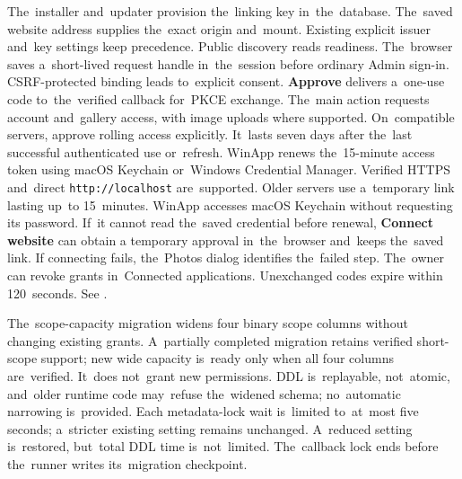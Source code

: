\documentclass[11pt,a4paper]{article}
\newcommand{\filepath}[1]{\path{#1}}
\newcommand{\ui}[1]{\textbf{#1}}
\begin{document}
The~installer and~updater provision the~linking key in~the~database.
The~saved website address supplies the~exact origin and~mount.
Existing explicit issuer and~key settings keep precedence. Public discovery
reads readiness. The~browser saves a~short-lived request handle in~the~session
before ordinary Admin sign-in. CSRF-protected binding leads to~explicit consent.
\ui{Approve} delivers a~one-use code to~the~verified callback for~PKCE exchange.
The~main action requests account and~gallery access, with image uploads where
supported. On~compatible servers, approve rolling access explicitly. It~lasts
seven days after the~last successful authenticated use or~refresh. WinApp
renews the~15-minute access token using macOS Keychain or~Windows Credential
Manager. Verified HTTPS and~direct \texttt{http://localhost} are~supported. Older
servers use a~temporary link lasting up~to 15~minutes.
WinApp accesses macOS Keychain without requesting its password. If~it cannot
read the~saved credential before renewal, \ui{Connect website} can obtain a
temporary approval in~the~browser and~keeps the~saved link.
If connecting fails, the~Photos dialog identifies the~failed step.
The~owner can revoke grants in~Connected
applications. Unexchanged codes expire within 120~seconds. See
\filepath{docs/APP_LINKING_PHASE_0.md}.

The~scope-capacity migration widens four binary scope columns without changing
existing grants. A~partially completed migration retains verified short-scope
support; new wide capacity is~ready only when all four columns are~verified.
It~does not~grant new permissions. DDL is~replayable, not~atomic, and~older
runtime code may~refuse the~widened schema; no~automatic narrowing is~provided.
Each metadata-lock wait is~limited to~at~most five seconds; a~stricter existing
setting remains unchanged. A~reduced setting is~restored, but~total DDL time
is~not~limited. The~callback lock
ends before the~runner writes its~migration checkpoint.
\end{document}
